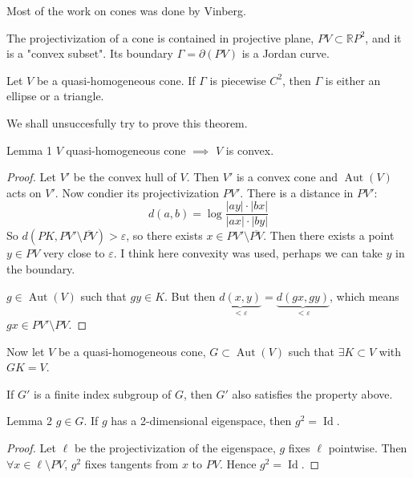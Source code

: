 \begin{remark}[Misha]\leavevmode
	Most of the work on cones was done by Vinberg.
\end{remark}

The projectivization of a cone is contained in projective plane, $PV\subset \mathbb{R}P^{2}$, and it is a "convex subset". Its boundary $ \Gamma=\partial(PV)$ is a Jordan curve.

\begin{thm}\leavevmode
	Let $V$ be a quasi-homogeneous cone. If $\Gamma$ is piecewise $C^2$, then $\Gamma$ is either an ellipse or a triangle.
\end{thm}

We shall unsuccesfully try to prove this theorem.

\begin{thing4}{Lemma 1}\leavevmode
	$V$ quasi-homogeneous cone $\implies $ $V$ is convex.
\end{thing4}

\begin{proof}\leavevmode
	Let $V'$ be the convex hull of  $V$. Then  $V'$ is a convex cone and  $\operatorname{Aut}(V)$ acts on $V'$. Now condier its projectivization $PV'$. There is a distance in $PV'$:
	 \[d(a,b)=\operatorname{log}\frac{|ay|\cdot |bx|}{|ax|\cdot |by|}\]
	 So $d(PK,PV'\setminus \overline{PV})>\varepsilon$, so there exists $x \in PV'\setminus \overline{PV}$. Then there exists a point $y \in PV$ very close to $\varepsilon$. I think here convexity was used, perhaps we can take $y $ in the boundary.

	 $g\in\operatorname{Aut}(V)$ such that $gy \in K$. But then $\underbrace{d(x,y)}_{<\varepsilon}=\underbrace{d(gx,gy)}_{<\varepsilon}$, which means $gx\in PV'\setminus PV$.
\end{proof}

Now let $V$ be a quasi-homogeneous cone,  $G\subset \operatorname{Aut}(V)$ such that $ \exists K\subset V$ with $GK=V$.

If  $G'$ is a finite index subgroup of  $G$, then $G'$ also satisfies the property above.

\begin{thing5}{Lemma 2}\leavevmode
	$g \in G$. If $g$ has a 2-dimensional eigenspace, then $g^2=\operatorname{Id}$.
\end{thing5}

\begin{proof}\leavevmode
	Let $\ell$ be the projectivization of the eigenspace, $g$ fixes $\ell$ pointwise. Then $\forall x\in\ell\setminus PV$, $g^2$ fixes tangents from $x$ to $PV$. Hence  $g^2=\operatorname{Id}$.
\end{proof}

